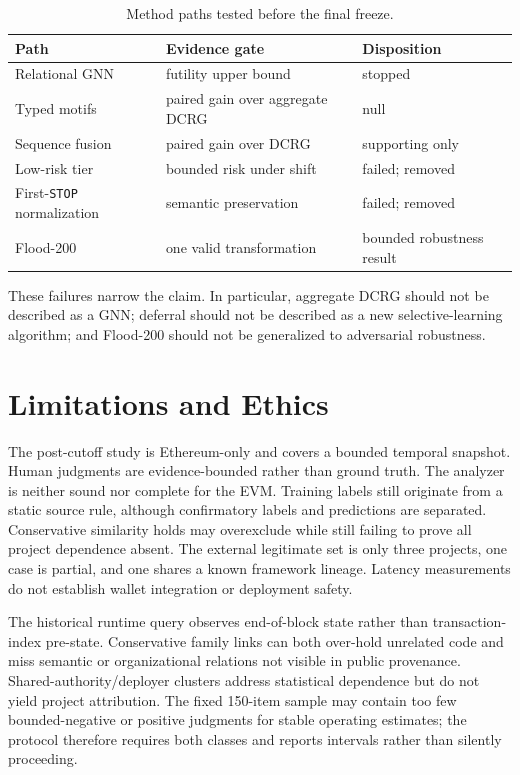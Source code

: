 \documentclass[conference]{IEEEtran}
\newcommand{\code}[1]{\texttt{#1}}
\begin{document}
\begin{table}[t]
\centering
\caption{Method paths tested before the final freeze.}
\label{tab:negative}
\small
\begin{tabularx}{\columnwidth}{lXX}
\toprule
Path & Evidence gate & Disposition \\
\midrule
Relational GNN & futility upper bound & stopped \\
Typed motifs & paired gain over aggregate DCRG & null \\
Sequence fusion & paired gain over DCRG & supporting only \\
Low-risk tier & bounded risk under shift & failed; removed \\
First-\code{STOP} normalization & semantic preservation & failed; removed \\
Flood-200 & one valid transformation & bounded robustness result \\
\bottomrule
\end{tabularx}
\end{table}

These failures narrow the claim. In particular, aggregate DCRG should not be described as a GNN;
deferral should not be described as a new selective-learning algorithm; and Flood-200 should not be
generalized to adversarial robustness.

\section{Limitations and Ethics}

The post-cutoff study is Ethereum-only and covers a bounded temporal snapshot. Human judgments are
evidence-bounded rather than ground truth. The analyzer is neither sound nor complete for the EVM.
Training labels still originate from a static source rule, although confirmatory labels and
predictions are separated. Conservative similarity holds may overexclude while still failing to
prove all project dependence absent. The external legitimate set is only three projects, one case is
partial, and one shares a known framework lineage. Latency measurements do not establish wallet
integration or deployment safety.

The historical runtime query observes end-of-block state rather than transaction-index pre-state.
Conservative family links can both over-hold unrelated code and miss semantic or organizational
relations not visible in public provenance. Shared-authority/deployer clusters address statistical
dependence but do not yield project attribution. The fixed 150-item sample may contain too few
bounded-negative or positive judgments for stable operating estimates; the protocol therefore
requires both classes and reports intervals rather than silently proceeding.
\end{document}
